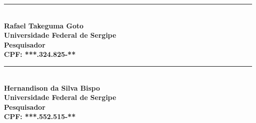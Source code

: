 \documentclass[11pt,a4paper]{article}
\begin{document}
\begin{center}
\vspace{4.8em}

\begin{minipage}{0.45\textwidth}
\centering
\rule{7cm}{0.4pt}\\[0.4em]
\textbf{Rafael Takeguma Goto}\\
\textbf{Universidade Federal de Sergipe}\\
\textbf{Pesquisador}\\
\textbf{CPF: ***.324.825-**}
\end{minipage}
\hfill
\begin{minipage}{0.45\textwidth}
\centering
\rule{7cm}{0.4pt}\\[0.4em]
\textbf{Hernandison da Silva Bispo}\\
\textbf{Universidade Federal de Sergipe}\\
\textbf{Pesquisador}\\
\textbf{CPF: ***.552.515-**}
\end{minipage}

\vspace{4.8em}




\end{center}
\end{document}
